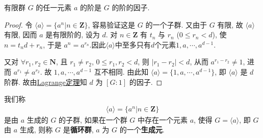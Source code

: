 \documentclass[../../main.tex]{subfiles}
\begin{document}
\begin{corollary}\label{corollary:抽象代数-推论 1.3.4}
有限群 \( G \) 的任一元素 \( a \) 的阶是 \( G \) 的阶的因子.
\end{corollary}
\begin{proof}
令 \( \langle a \rangle = \{a^n|n \in \mathbf{Z}\} \), 容易验证这是 \( G \) 的一个子群. 又由于 \( G \) 有限, 故 \( \langle a \rangle \) 有限, 因而 \( a \) 是有限阶的, 设为 \( d \). 对 \( n \in \mathbf{Z} \) 有 \( t_n \) 与 \( r_n \) (\( 0 \leqslant r_n < d \)), 使 \( n = t_nd + r_n \), 于是 \( a^n = a^{r_n} \).因此$\langle a \rangle$中至多只有$d$个元素$1,a,\cdots,a^{d-1}$.

又对 \( \forall r_1, r_2 \in \mathbf{N} \), 且 \( r_1 \neq r_2 \), \( 0 \leqslant r_1, r_2 < d \), 则 \( |r_1 - r_2| < d \), 从而 \( a^{r_1 - r_2} \neq 1 \), 进而 \( a^{r_1} \neq a^{r_2} \). 故 \( 1, a, \cdots, a^{d-1} \) 互不相同.
由此知 \( \langle a \rangle = \{1, a, \cdots, a^{d-1}\} \), 即 \( \langle a \rangle \) 是 \( d \) 阶群. 故由\hyperref[theorem:抽象代数-Lagrange定理-定理 1.3.3]{Lagrange定理}知 \( d \) 为 \( [G:1] \) 的因子.

\end{proof}

\begin{definition}[循环群]
我们称
\begin{align*}
\langle a \rangle = \{a^n|n \in \mathbf{Z}\}
\end{align*}
是由 \( a \) 生成的 \( G \) 的子群, 如果在一个群 \( G \) 中存在一个元素 \( a \), 使得 \( G = \langle a \rangle \), 即 \( G \) 由 \( a \) 生成, 则称 \( G \) 是\textbf{循环群}, \( a \) 为 \( G \) 的一个\textbf{生成元}.
\end{definition}
\end{document}
